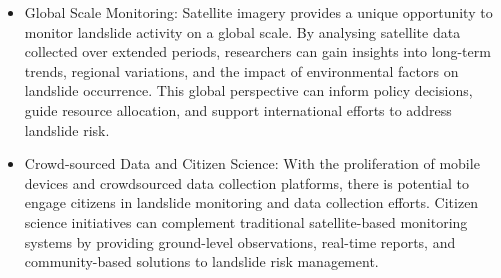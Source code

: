 \documentclass[12pt,a4paper]{report}
\begin{document}
\begin{itemize}
    \item Global Scale Monitoring: Satellite imagery provides a unique opportunity to monitor landslide activity on a global scale. By analysing satellite data collected over extended periods, researchers can gain insights into long-term trends, regional variations, and the impact of environmental factors on landslide occurrence. This global perspective can inform policy decisions, guide resource allocation, and support international efforts to address landslide risk.
\item Crowd-sourced Data and Citizen Science: With the proliferation of mobile devices and crowdsourced data collection platforms, there is potential to engage citizens in landslide monitoring and data collection efforts. Citizen science initiatives can complement traditional satellite-based monitoring systems by providing ground-level observations, real-time reports, and community-based solutions to landslide risk management. 
	
	\end{itemize}

	

	\newpage



 
 

	
\end{document}

